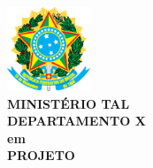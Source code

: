 \begin{center}
   		\textbf{\includegraphics[width=2.5cm]{img/logo_armas_nacionais.eps}\\
   			MINISTÉRIO TAL\\
   			DEPARTAMENTO X\\}
   		\vspace{3ex}
   		\textbf{\MakeUppercase{\titulo} em \gdh} \\
   		\vspace{1.5ex}
   		\textbf{PROJETO \nomeProjeto}
\end{center}

